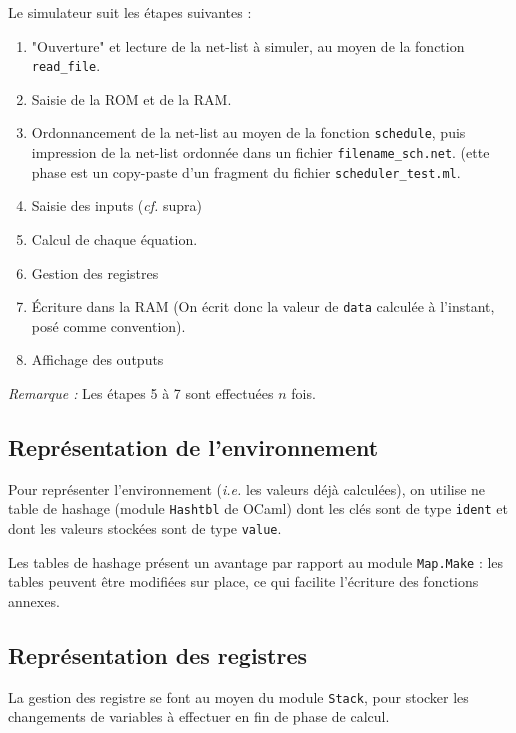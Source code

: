 \documentclass[11pt,a4paper]{article}
\newcommand{\ie}{\textit{i.e. }}
\newcommand{\cf}{\textit{cf. }}
\newcommand{\Rq}{\textit{Remarque : }}
\begin{document}
Le simulateur suit les étapes suivantes :
\begin{enumerate}
	\item "Ouverture" et lecture de la net-list à simuler, au moyen de la fonction \verb&read_file&.
	\item Saisie de la ROM et de la RAM.
	
	\item Ordonnancement de la net-list au moyen de la fonction 
\verb&schedule&, puis impression de la net-list ordonnée dans un fichier 
\verb&filename_sch.net&. (ette phase est un copy-paste d'un fragment du fichier
\verb&scheduler_test.ml&.
	
	\item Saisie des inputs (\cf supra)
	
	\item Calcul de chaque équation.
	
	\item Gestion des registres
	
	\item Écriture dans la RAM (On écrit donc la valeur de \verb&data& calculée à l'instant, posé comme convention).
	
	\item Affichage des outputs
\end{enumerate}

\Rq Les étapes 5 à 7 sont effectuées $n$ fois.

\subsection{Représentation de l'environnement}

Pour représenter l'environnement (\ie les valeurs déjà calculées), on utilise ne table de hashage (module \verb&Hashtbl& de OCaml) dont les clés sont de type \verb&ident& et dont les valeurs stockées sont de type \verb&value&.

Les tables de hashage présent un avantage par rapport au module \verb&Map.Make& : les tables peuvent être modifiées sur place, ce qui facilite l'écriture des fonctions annexes.

\subsection{Représentation des registres}

La gestion des registre se font au moyen du module \verb&Stack&, pour stocker les changements de variables à effectuer en fin de phase de calcul.
\end{document}
